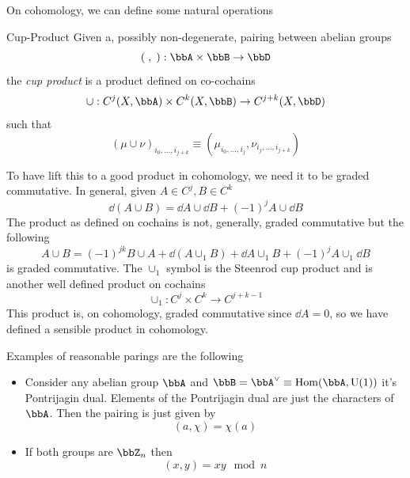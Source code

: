 \documentclass[11pt]{article}
\theoremstyle{definition}
\numberwithin{equation}{section}
\newcommand\Hom{\mathrm{Hom}}
\newcommand*\U{\mathrm{U}}
\begin{document}
On cohomology, we can define some natural operations
\begin{defn}{Cup-Product}{}
	Given a, possibly non-degenerate, pairing between abelian groups
	\begin{equation}
		(\;,\;):\bbA\times \bbB \rightarrow \bbD
	\end{equation}
	the \textit{cup product} is a product defined on co-cochains
	\begin{equation}
		\cup:C^j(X,\bbA)\times C^k(X,\bbB)\rightarrow C^{j+k}(X,\bbD)
	\end{equation}
	such that
	\begin{equation}
		(\mu \cup \nu)_{i_0,\ldots,i_{j+k}}\equiv (\mu_{i_0,\ldots, i_j},\nu_{i_j,\ldots, i_{j+k}})
	\end{equation}
\end{defn}
To have lift this to a good product in cohomology, we need it to be graded commutative. In general, given $A\in C^j, B\in C^k$
\begin{equation}
	\dd(A\cup B)=\dd{A}\cup \dd{B}+(-1)^j A\cup\dd{B}
\end{equation}
The product as defined on cochains is not, generally, graded commutative but the following
\begin{equation}
	A\cup B=(-1)^{jk}B\cup A+\dd{(A\cup_1 B)}+\dd{A}\cup_1 B+(-1)^j A\cup_1\dd{B}
\end{equation}
is graded commutative. The $\cup_1$ symbol is the Steenrod cup product and is another well defined product on cochains
\begin{equation}
	\cup_1:C^j\times C^k\rightarrow C^{j+k-1}
\end{equation}
This product is, on cohomology, graded commutative since $\dd{A}=0$, so we have defined a sensible product in cohomology.

Examples of reasonable parings are the following
\begin{itemize}
	\item Consider any abelian group $\bbA$ and $\bbB=\bbA^\vee\equiv \Hom(\bbA,\U(1))$ it's Pontrijagin dual. Elements of the Pontrijagin dual are just the characters of $\bbA$. Then the pairing is just given by
	\begin{equation}
		(a,\chi)=\chi(a)
	\end{equation}
	\item If both groups are $\bbZ_n$ then
	\begin{equation}
		(x,y)=xy\mod n
	\end{equation}
\end{itemize}
\end{document}
